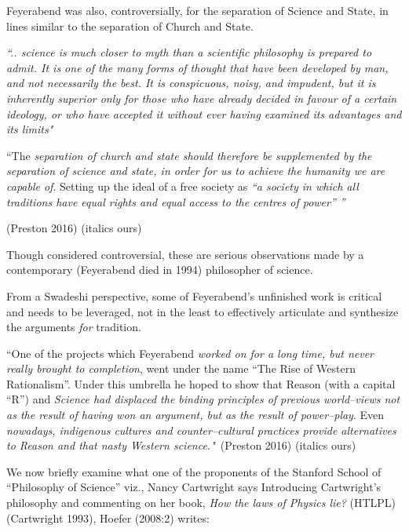 Feyerabend was also, controversially, for the separation of Science and State, in lines similar to the separation of Church and State.

\begin{myquote}
\textit{“.. science is much closer to myth than a scientific philosophy is prepared to admit. It is one of the many forms of thought that have been developed by man, and not necessarily the best. It is conspicuous, noisy, and impudent, but it is inherently superior only for those who have already decided in favour of a certain ideology, or who have accepted it without ever having examined its advantages and its limits"}
\end{myquote}

\begin{myquote}
“The \textit{separation of church and state should therefore be supplemented by the separation of science and state, in order for us to achieve the humanity we are capable of}. Setting up the ideal of a free society as \textit{“a society in which all traditions have equal rights and equal access to the centres of power” ”}
\end{myquote}

\hfill (Preston 2016) (italics ours)

Though considered controversial, these are serious observations made by a contemporary (Feyerabend died in 1994) philosopher of science.

From a Swadeshi perspective, some of Feyerabend’s unfinished work is critical and needs to be leveraged, not in the least to effectively articulate and synthesize the arguments \textit{for} tradition.

\begin{myquote}
“One of the projects which Feyerabend \textit{worked on for a long time, but never really brought to completion}, went under the name “The Rise of Western Rationalism”. Under this umbrella he hoped to show that Reason (with a capital “R”) and \textit{Science had displaced the binding principles of previous world–views not as the result of having won an argument, but as the result of power–play}. Even \textit{nowadays, indigenous cultures and counter–cultural practices provide alternatives to Reason and that nasty Western science."}~\hfill (Preston 2016) (italics ours)
\end{myquote}

We now briefly examine what one of the proponents of the Stanford School of “Philosophy of Science” viz., Nancy Cartwright says Introducing Cartwright’s philosophy and commenting on her book, \textit{How the laws of Physics lie?} (HTLPL) (Cartwright 1993), Hoefer (2008:2) writes:

